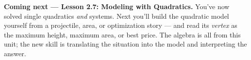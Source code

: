 \documentclass[10pt]{article}
\begin{document}
\begin{spiralbox}
\textbf{Coming next --- Lesson 2.7: Modeling with Quadratics.} You've now solved single quadratics \emph{and}
systems. Next you'll build the quadratic model yourself from a projectile, area, or optimization story --- and read
its \emph{vertex} as the maximum height, maximum area, or best price. The algebra is all from this unit; the new
skill is translating the situation into the model and interpreting the answer.
\end{spiralbox}
\end{document}
